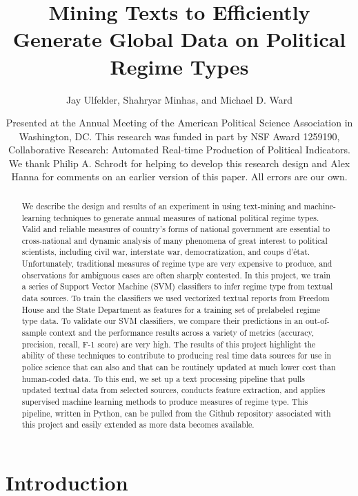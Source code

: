 \documentclass[pdftex,12pt,fullpage,oneside]{amsart}
\title{Mining Texts to Efficiently Generate Global Data on Political Regime Types}
\author{Jay Ulfelder, Shahryar Minhas, and Michael D. Ward}
\date{Presented at the Annual Meeting of the American Political Science Association in Washington, DC. This research was funded in part by NSF Award 1259190, Collaborative Research: Automated Real-time Production of Political Indicators. We thank Philip A. Schrodt for helping to develop this research design and Alex Hanna for comments on an earlier version of this paper. All errors are our own.}
\begin{document}
\maketitle

\singlespacing
\begin{abstract}
We describe the design and results of an experiment in using text-mining and machine-learning techniques to generate annual measures of national political regime types. Valid and reliable measures of country's forms of national government are essential to cross-national and dynamic analysis of many phenomena of great interest to political scientists, including civil war, interstate war, democratization, and coups d'\'{e}tat. Unfortunately, traditional measures of regime type are very expensive to produce, and observations for ambiguous cases are often sharply contested. In this project, we train a series of Support Vector Machine (SVM) classifiers to infer regime type from textual data sources. To train the classifiers we used vectorized textual reports from Freedom House and the State Department as features for a training set of prelabeled regime type data. To validate our SVM classifiers, we compare their predictions in an out-of-sample context and the performance results across a variety of metrics (accuracy, precision, recall, F-1 score) are very high. The results of this project highlight the ability of these techniques to contribute to producing real time data sources for use in police science that can also and that can be routinely updated at much lower cost than human-coded data. To this end, we set up a text processing pipeline that pulls updated textual data from selected sources, conducts feature extraction, and applies supervised machine learning methods to produce measures of regime type. This pipeline, written in Python, can be pulled from the Github repository associated with this project and easily extended as more data becomes available.
\end{abstract} 

\newpage
\newpage\setcounter{page}{1} 
\doublespacing

\section{Introduction}
\end{document}
